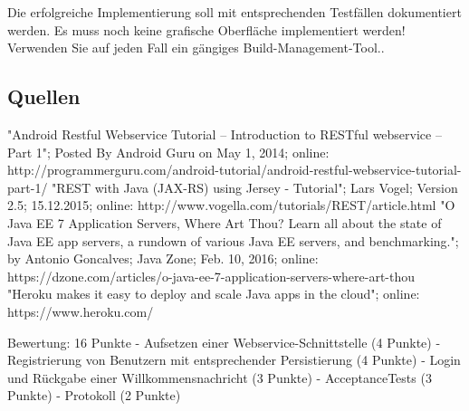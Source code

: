 Die erfolgreiche Implementierung soll mit entsprechenden Testfällen dokumentiert werden. Es muss noch keine grafische Oberfläche implementiert werden! Verwenden Sie auf jeden Fall ein gängiges Build-Management-Tool..
\clearpage

\subsection{Quellen}

"Android Restful Webservice Tutorial – Introduction to RESTful webservice – Part 1"; Posted By Android Guru on May 1, 2014; online: http://programmerguru.com/android-tutorial/android-restful-webservice-tutorial-part-1/
"REST with Java (JAX-RS) using Jersey - Tutorial"; Lars Vogel; Version 2.5; 15.12.2015; online: http://www.vogella.com/tutorials/REST/article.html
"O Java EE 7 Application Servers, Where Art Thou? Learn all about the state of Java EE app servers, a rundown of various Java EE servers, and benchmarking."; by Antonio Goncalves; Java Zone; Feb. 10, 2016; online: https://dzone.com/articles/o-java-ee-7-application-servers-where-art-thou
"Heroku makes it easy to deploy and scale Java apps in the cloud"; online: https://www.heroku.com/

Bewertung: 16 Punkte
- Aufsetzen einer Webservice-Schnittstelle (4 Punkte)
- Registrierung von Benutzern mit entsprechender Persistierung (4 Punkte)
- Login und Rückgabe einer Willkommensnachricht (3 Punkte)
- AcceptanceTests (3 Punkte)
- Protokoll (2 Punkte)
\clearpage
